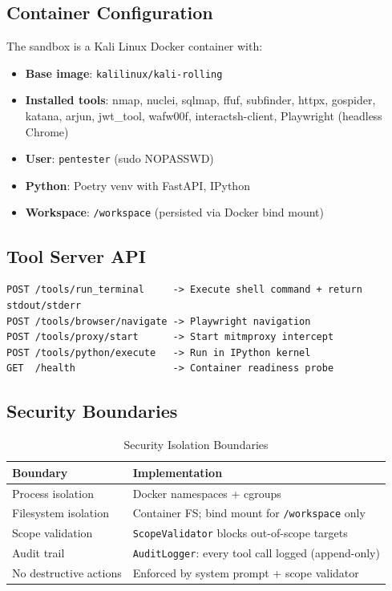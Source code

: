 \documentclass[12pt,a4paper]{article}
\begin{document}
\subsection{Container Configuration}

The sandbox is a Kali Linux Docker container with:

\begin{itemize}
  \item \textbf{Base image}: \texttt{kalilinux/kali-rolling}
  \item \textbf{Installed tools}: nmap, nuclei, sqlmap, ffuf, subfinder, httpx, gospider, katana, arjun, jwt\_tool, wafw00f, interactsh-client, Playwright (headless Chrome)
  \item \textbf{User}: \texttt{pentester} (sudo NOPASSWD)
  \item \textbf{Python}: Poetry venv with FastAPI, IPython
  \item \textbf{Workspace}: \texttt{/workspace} (persisted via Docker bind mount)
\end{itemize}

\subsection{Tool Server API}

\begin{lstlisting}[caption={Tool server REST endpoints (FastAPI)}]
POST /tools/run_terminal     -> Execute shell command + return stdout/stderr
POST /tools/browser/navigate -> Playwright navigation
POST /tools/proxy/start      -> Start mitmproxy intercept
POST /tools/python/execute   -> Run in IPython kernel
GET  /health                 -> Container readiness probe
\end{lstlisting}

\subsection{Security Boundaries}

\begin{table}[H]
\centering
\caption{Security Isolation Boundaries}
\begin{tabular}{ll}
\toprule
\textbf{Boundary} & \textbf{Implementation} \\
\midrule
Process isolation & Docker namespaces + cgroups \\
Filesystem isolation & Container FS; bind mount for \texttt{/workspace} only \\
Scope validation & \texttt{ScopeValidator} blocks out-of-scope targets \\
Audit trail & \texttt{AuditLogger}: every tool call logged (append-only) \\
No destructive actions & Enforced by system prompt + scope validator \\
\bottomrule
\end{tabular}
\end{table}
\end{document}
